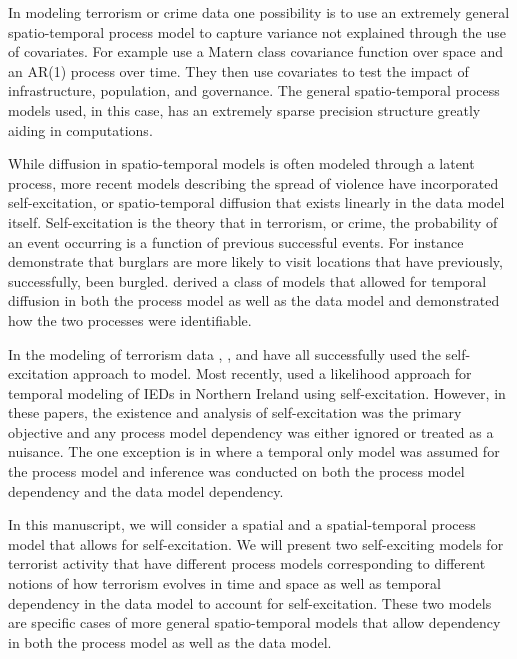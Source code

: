 \documentclass[11pt]{isuthesis}
\begin{document}
In modeling terrorism or crime data one possibility is to use an extremely general spatio-temporal process model to capture variance not explained through the use of covariates.  For example \cite{python2016bayesian} use a Matern class covariance function over space and an AR(1) process over time.  They then use covariates to test the impact of infrastructure, population, and governance.  The general spatio-temporal process models used, in this case, has an extremely sparse precision structure greatly aiding in computations.

While diffusion in spatio-temporal models is often modeled through a latent process, more recent models describing the spread of violence have incorporated self-excitation, or spatio-temporal diffusion that exists linearly in the data model itself.  Self-excitation is the theory that in terrorism, or crime, the probability of an event occurring is a function of previous successful events.  For instance \cite{mohler2011self} demonstrate that burglars are more likely to visit locations that have previously, successfully, been burgled.  \cite{mohler2013modeling} derived a class of models that allowed for temporal diffusion in both the process model as well as the data model and demonstrated how the two processes were identifiable.

In the modeling of terrorism data \cite{lewis2012self}, \cite{porter2012self}, and \cite{mohler2013modeling} have all successfully used the self-excitation approach to model.  Most recently, \cite{tench2016spatio} used a likelihood approach for temporal modeling of IEDs in Northern Ireland using self-excitation.  However, in these papers, the existence and analysis of self-excitation was the primary objective and any process model dependency was either ignored or treated as a nuisance.  The one exception is in \cite{mohler2013modeling} where a temporal only model was assumed for the process model and inference was conducted on both the process model dependency and the data model dependency.

In this manuscript, we will consider a spatial and a spatial-temporal process model that allows for self-excitation.  We will present two self-exciting models for terrorist activity that have different process models corresponding to different notions of how terrorism evolves in time and space as well as temporal dependency in the data model to account for self-excitation.  These two models are specific cases of more general spatio-temporal models that allow dependency in both the process model as well as the data model.
\end{document}
